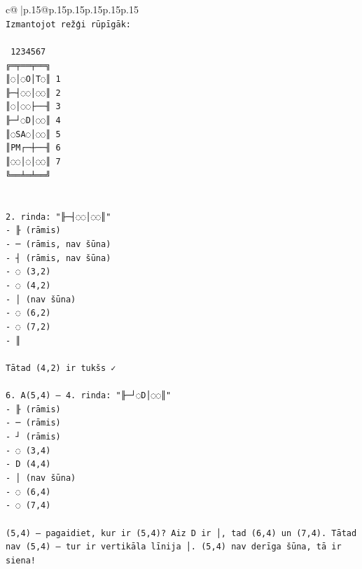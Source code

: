 \documentclass{article}
\begin{document}
{\begin{supertabular}{c@{$\;$}|p{.15\linewidth}@{}p{.15\linewidth}p{.15\linewidth}p{.15\linewidth}p{.15\linewidth}p{.15\linewidth}}
{{{\\ 
\texttt{Izmantojot režģi rūpīgāk:} \\
\\ 
\texttt{ 1234567} \\
\texttt{╔═╤══╤══╗} \\
\texttt{║◌│◌O│T◌║ 1} \\
\texttt{╟─┤◌◌│◌◌║ 2} \\
\texttt{║◌│◌◌├──╢ 3} \\
\texttt{╟─┘◌D│◌◌║ 4} \\
\texttt{║◌SA◌│◌◌║ 5} \\
\texttt{║PM┌─┼──╢ 6} \\
\texttt{║◌◌│◌│◌◌║ 7} \\
\texttt{╚══╧═╧══╝} \\
\\ 
\\ 
\texttt{2. rinda: "╟─┤◌◌│◌◌║"} \\
\texttt{{-} ╟ (rāmis)} \\
\texttt{{-} ─ (rāmis, nav šūna)} \\
\texttt{{-} ┤ (rāmis, nav šūna)} \\
\texttt{{-} ◌ (3,2)} \\
\texttt{{-} ◌ (4,2)} \\
\texttt{{-} │ (nav šūna)} \\
\texttt{{-} ◌ (6,2)} \\
\texttt{{-} ◌ (7,2)} \\
\texttt{{-} ║} \\
\\ 
\texttt{Tātad (4,2) ir tukšs ✓} \\
\\ 
\texttt{6. A(5,4) — 4. rinda: "╟─┘◌D│◌◌║"} \\
\texttt{{-} ╟ (rāmis)} \\
\texttt{{-} ─ (rāmis)} \\
\texttt{{-} ┘ (rāmis)} \\
\texttt{{-} ◌ (3,4)} \\
\texttt{{-} D (4,4)} \\
\texttt{{-} │ (nav šūna)} \\
\texttt{{-} ◌ (6,4)} \\
\texttt{{-} ◌ (7,4)} \\
\\ 
\texttt{(5,4) — pagaidiet, kur ir (5,4)? Aiz D ir │, tad (6,4) un (7,4). Tātad nav (5,4) — tur ir vertikāla līnija │. (5,4) nav derīga šūna, tā ir siena!} \\
\\ 
}}}
\end{supertabular}}
\end{document}
